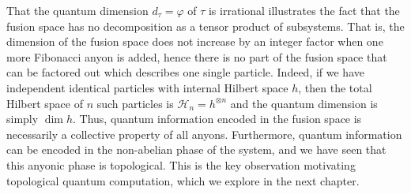 \documentclass[a4paper,10pt,oneside]{book}
\theoremstyle{plain}
\newtheorem{proposition}[theorem]{Proposition}
\theoremstyle{definition}
\theoremstyle{remark}
\begin{document}
That the quantum dimension $d_τ = φ$ of $τ$ is irrational illustrates the fact that the fusion space has no decomposition as a tensor product of subsystems. That is, the dimension of the fusion space does not increase by an integer factor when one more Fibonacci anyon is added, hence there is no part of the fusion space that can be factored out which describes one single particle. Indeed, if we have independent identical particles with internal Hilbert space $h$, then the total Hilbert space of $n$ such particles is $\mathcal{H}_n = h^{⊗n}$ and the quantum dimension is simply $\dim h$. Thus, quantum information encoded in the fusion space is necessarily a collective property of all anyons. Furthermore, quantum information can be encoded in the non-abelian phase of the system, and we have seen that this anyonic phase is topological. This is the key observation motivating topological quantum computation, which we explore in the next chapter.



\end{document}
